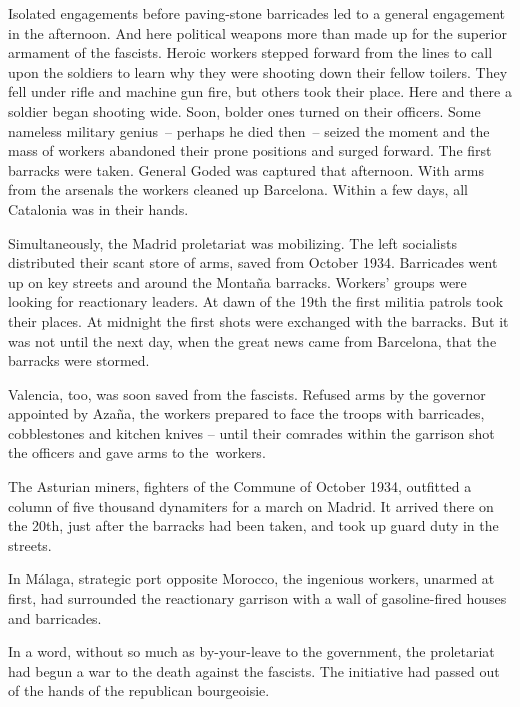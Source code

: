Isolated engagements before paving-stone barricades led to a general engagement in the afternoon. And here political weapons more than made up for the superior armament of the fascists. Heroic workers stepped forward from the lines to call upon the soldiers to learn why they were shooting down their fellow toilers. They fell under rifle and machine gun fire, but others took their place. Here and there a soldier began shooting wide. Soon, bolder ones turned on their officers. Some nameless military genius~-- perhaps he died then~-- seized the moment and the mass of workers abandoned their prone positions and surged forward. The first barracks were taken. General Goded was captured that afternoon. With arms from the arsenals the workers cleaned up Barcelona. Within a few days, all Catalonia was in their hands.

Simultaneously, the Madrid proletariat was mobilizing. The left socialists distributed their scant store of arms, saved from October 1934. Barricades went up on key streets and around the Montaña barracks. Workers’ groups were looking for reactionary leaders. At dawn of the 19th the first militia patrols took their places. At midnight the first shots were exchanged with the barracks. But it was not until the next day, when the great news came from Barcelona, that the barracks were stormed.

Valencia, too, was soon saved from the fascists. Refused arms by the governor appointed by Azaña, the workers prepared to face the troops with barricades, cobblestones and kitchen knives -- until their comrades within the garrison shot the officers and gave arms to the~workers.

The Asturian miners, fighters of the Commune of October 1934, outfitted a column of five thousand dynamiters for a march on Mad\-rid. It arrived there on the 20th, just after the barracks had been taken, and took up guard duty in the streets.

In M\'alaga, strategic port opposite Morocco, the ingenious workers, unarmed at first, had surrounded the reactionary garrison with a wall of gasoline-fired houses and barricades.

In a word, without so much as by-your-leave to the government, the proletariat had begun a war to the death against the fascists. The initiative had passed out of the hands of the republican bourgeoisie.

